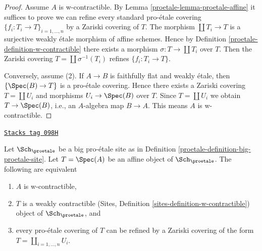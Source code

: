 \begin{proof}

Assume $A$ is w-contractible. By Lemma \ref{proetale-lemma-proetale-affine}
it suffices to prove we can refine every standard pro-\'etale covering
$\{f_i : T_i \to T\}_{i = 1, \ldots, n}$ by a Zariski covering of $T$.
The morphism $\coprod T_i \to T$ is a surjective weakly \'etale morphism
of affine schemes. Hence by Definition \ref{proetale-definition-w-contractible}
there exists a morphism $\sigma : T \to \coprod T_i$ over $T$.
Then the Zariski covering $T = \coprod \sigma^{-1}(T_i)$
refines $\{f_i : T_i \to T\}$.

\medskip\noindent
Conversely, assume (2). If $A \to B$ is faithfully flat and weakly \'etale,
then $\{\Spec(B) \to T\}$ is a pro-\'etale covering.
Hence there exists a Zariski covering $T = \coprod U_i$
and morphisms $U_i \to \Spec(B)$ over $T$. Since $T = \coprod U_i$
we obtain $T \to \Spec(B)$, i.e., an $A$-algebra map $B \to A$.
This means $A$ is w-contractible.
\end{proof}

\begin{lemma}
\label{proetale-lemma-w-contractible-is-weakly-contractible}
\href{https://stacks.math.columbia.edu/tag/098H}{\texttt{Stacks tag 098H}}

Let $\Sch_\proetale$ be a big pro-\'etale site as in
Definition \ref{proetale-definition-big-proetale-site}.
Let $T = \Spec(A)$ be an affine object of $\Sch_\proetale$.
The following are equivalent
\begin{enumerate}
\item $A$ is w-contractible,
\item $T$ is a weakly contractible
(Sites, Definition \ref{sites-definition-w-contractible})
object of $\Sch_\proetale$, and
\item every pro-\'etale covering of $T$ can be refined by
a Zariski covering of the form $T = \coprod_{i = 1, \ldots, n} U_i$.
\end{enumerate}
\end{lemma}

